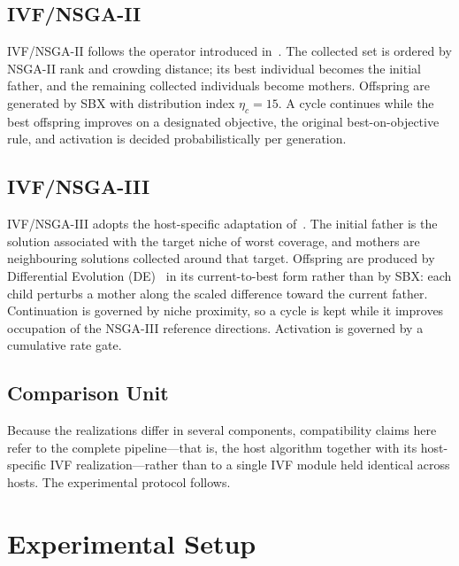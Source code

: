 \documentclass[runningheads]{llncs}
\begin{document}
\subsection{IVF/NSGA-II}
\label{sec:ivfnsgaii}

IVF/NSGA-II follows the operator introduced in~\cite{sampaio2017ivf}. The collected set is ordered by NSGA-II rank and crowding distance; its best individual becomes the initial father, and the remaining collected individuals become mothers. Offspring are generated by SBX with distribution index $\eta_c=15$. A cycle continues while the best offspring improves on a designated objective, the original best-on-objective rule, and activation is decided probabilistically per generation.

\subsection{IVF/NSGA-III}
\label{sec:ivfnsgaiii}

IVF/NSGA-III adopts the host-specific adaptation of~\cite{Sampaio2024}. The initial father is the solution associated with the target niche of worst coverage, and mothers are neighbouring solutions collected around that target. Offspring are produced by Differential Evolution (DE)~\cite{storn1997de} in its current-to-best form rather than by SBX: each child perturbs a mother along the scaled difference toward the current father. Continuation is governed by niche proximity, so a cycle is kept while it improves occupation of the NSGA-III reference directions. Activation is governed by a cumulative rate gate.

\subsection{Comparison Unit}
\label{sec:comparison_unit}

Because the realizations differ in several components, compatibility claims here refer to the complete pipeline---that is, the host algorithm together with its host-specific IVF realization---rather than to a single IVF module held identical across hosts. The experimental protocol follows.

\section{Experimental Setup}
\label{sec:setup}
\end{document}
